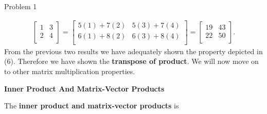 \begin{problem}{Problem 1}
\begin{Highlight}[Solution]
\begin{align*}
\begin{bmatrix}
                1 & 3 \\
                2 & 4 \\
            \end{bmatrix}
            = 
            \begin{bmatrix}
                5(1) + 7(2) & 5(3) + 7(4) \\
                6(1) + 8(2) & 6(3) + 8(4) \\
            \end{bmatrix}
            = 
            \begin{bmatrix}
                19 & 43 \\
                22 & 50 \\
            \end{bmatrix}.
        \end{align*}
        From the previous two results we have adequately shown the property depicted in (6). Therefore we have shown the \textbf{transpose of product}. We will now move on to other matrix multiplication
        properties. \vspace*{1em}

        \noindent \textbf{Inner Product And Matrix-Vector Products} \vspace*{1em}

        The \textbf{inner product and matrix-vector products} is 


\end{Highlight}
\end{problem}
